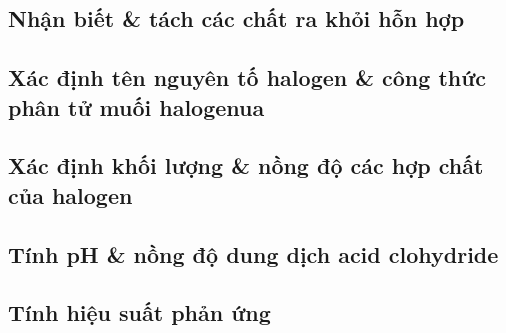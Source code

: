 \documentclass{article}
\numberwithin{equation}{section}
\begin{document}
\subsection{Nhận biết \& tách các chất ra khỏi hỗn hợp}


\subsection{Xác định tên nguyên tố halogen \& công thức phân tử muối halogenua}


\subsection{Xác định khối lượng \& nồng độ các hợp chất của halogen}


\subsection{Tính pH \& nồng độ dung dịch acid clohydride}


\subsection{Tính hiệu suất phản ứng}


\printbibliography[heading=bibintoc]
	
\end{document}

